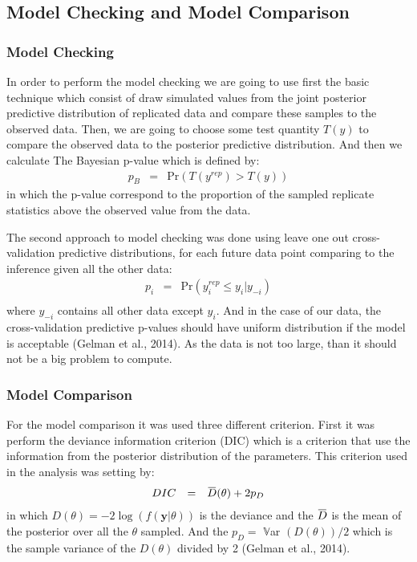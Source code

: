 \documentclass{asaproc}
\newcommand{\overbar}[1]{\mkern 1.5mu\overline{\mkern-1.5mu#1\mkern-1.5mu}\mkern 1.5mu}
\begin{document}
\subsection{Model Checking and Model Comparison}

\subsubsection{Model Checking}
In order to perform the model checking we are going to use first the basic technique which consist of draw simulated values from the joint posterior predictive distribution of replicated data and compare these samples to the observed data. Then, we are going to choose some test quantity $T(y)$ to compare the observed data to the posterior predictive distribution. And then we calculate The Bayesian p-value which is defined by:
\begin{equation*}
\begin{array}{lclll}
p_B & = & \mbox{Pr}(T(y^{rep})>T(y))
\end{array}
\end{equation*}
\noindent
in which the p-value correspond to the proportion of the sampled replicate statistics above the observed value from the data.

The second approach to model checking was done using leave one out cross-validation predictive distributions, for each future data point comparing to the inference given all the other data:
\begin{equation*}
\begin{array}{lclll}
p_i & = & \mbox{Pr}(y_i^{rep}\leq y_i|y_{-i})\\
\end{array}
\end{equation*}
\noindent
where $y_{-i}$ contains all other data except $y_i$. And in the case of our data, the cross-validation predictive p-values should have uniform  distribution if the model is acceptable  (Gelman et al., 2014). As the data is not too large, than it should not be a big problem to compute.
 
\subsubsection{Model Comparison}
For the model comparison it was used three different criterion. First it was perform the deviance information criterion (DIC) which is a criterion that use the information from the posterior distribution of the parameters. This criterion used in the analysis was setting by:
\begin{equation*}
\begin{array}{lclll}
DIC & = & \overbar{D}(\theta) + 2p_{D}\\
\end{array}
\end{equation*}
\noindent
in which $D(\theta) =  -2\log(f(\textbf{y}|\theta))$ is the deviance and the $\overbar{D}$ is the mean of the posterior over all the $\theta$ sampled. And the $p_{D} =$ $\mathds{V}$ar $(D(\theta))/2$ which is the sample variance of the $D(\theta)$ divided by 2 (Gelman et al., 2014).
\end{document}
